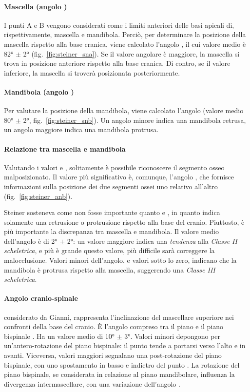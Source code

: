 \paragraph{Mascella (angolo )}
I punti A e B vengono considerati come i limiti anteriori delle basi apicali di, rispettivamente, mascella e mandibola. Perciò, per determinare la posizione della mascella rispetto alla base cranica, viene calcolato l'angolo , il cui valore medio è 82° $\pm$ 2° (fig.~\vref{fig:steiner_sna}). Se il valore angolare è maggiore, la mascella si trova in posizione anteriore rispetto alla base cranica. Di contro, se il valore inferiore, la mascella si troverà posizionata posteriormente.

\paragraph{Mandibola (angolo )}
Per valutare la posizione della mandibola, viene calcolato l'angolo  (valore medio 80° $\pm$ 2°, fig.~\ref{fig:steiner_snb}). Un angolo minore indica una mandibola retrusa, un angolo maggiore indica una mandibola protrusa.

\paragraph{Relazione tra mascella e mandibola}
Valutando i valori  e , solitamente è possibile riconoscere il segmento osseo malposizionato. Il valore più significativo è, comunque, l'angolo , che fornisce informazioni sulla posizione dei due segmenti ossei uno relativo all'altro (fig.~\vref{fig:steiner_anb}).

Steiner sosteneva come  non fosse importante quanto  e , in quanto indica solamente una retrusione o protrusione rispetto alla base del cranio. Piuttosto, è più importante la discrepanza tra mascella e mandibola. Il valore medio dell'angolo  è di 2° $\pm$ 2°: un valore maggiore indica una \textit{tendenza} alla \textit{Classe II scheletrica}, e più è grande questo valore, più difficile sarà correggere la malocclusione. Valori minori dell'angolo, e valori sotto lo zero, indicano che la mandibola è protrusa rispetto alla mascella, suggerendo una \textit{Classe III scheletrica}.

\paragraph{Angolo cranio-spinale} considerato da Giannì, rappresenta l'inclinazione del mascellare superiore nei confronti della base del cranio. È l'angolo compreso tra il piano  e il piano bispinale . Ha un valore medio di 10° $\pm$ 3°. Valori minori depongono per un'antero-rotazione del piano bispinale: il punto  tende a portarsi verso l'alto e in avanti. Viceversa, valori maggiori segnalano una post-rotazione del piano bispinale, con uno spostamento in basso e indietro del punto . La rotazione del piano bispinale, se considerata in relazione al piano mandibolare, influenza la divergenza intermascellare, con una variazione dell'angolo .


